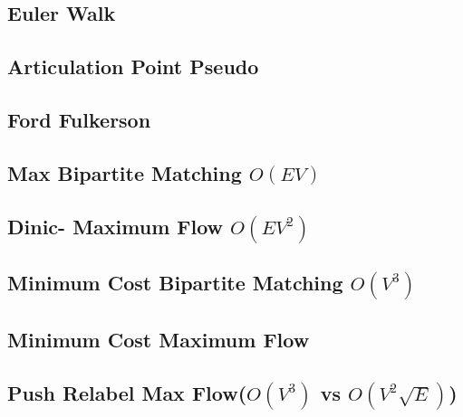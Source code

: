 \documentclass[9pt]{extarticle}
\begin{document}
\begin{multicols*}{3}
\subsection{Euler Walk} %


\subsection{Articulation Point Pseudo} %


% 

\subsection{Ford Fulkerson} %


\subsection{Max Bipartite Matching $O(EV)$} %



\subsection{Dinic- Maximum Flow $O(EV^2)$ } %


\subsection{Minimum Cost Bipartite Matching $O(V^3)$ } %


\subsection{Minimum Cost Maximum Flow } %


\subsection{Push Relabel Max Flow($O(V^3)$ vs $O(V^2\sqrt{E})$)}



\end{multicols*}
\end{document}
